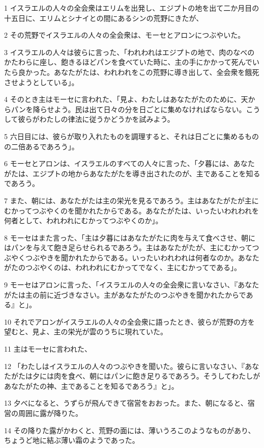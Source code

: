 \par 1 イスラエルの人々の全会衆はエリムを出発し、エジプトの地を出て二か月目の十五日に、エリムとシナイとの間にあるシンの荒野にきたが、
\par 2 その荒野でイスラエルの人々の全会衆は、モーセとアロンにつぶやいた。
\par 3 イスラエルの人々は彼らに言った、「われわれはエジプトの地で、肉のなべのかたわらに座し、飽きるほどパンを食べていた時に、主の手にかかって死んでいたら良かった。あなたがたは、われわれをこの荒野に導き出して、全会衆を餓死させようとしている」。
\par 4 そのとき主はモーセに言われた、「見よ、わたしはあなたがたのために、天からパンを降らせよう。民は出て日々の分を日ごとに集めなければならない。こうして彼らがわたしの律法に従うかどうかを試みよう。
\par 5 六日目には、彼らが取り入れたものを調理すると、それは日ごとに集めるものの二倍あるであろう」。
\par 6 モーセとアロンは、イスラエルのすべての人々に言った、「夕暮には、あなたがたは、エジプトの地からあなたがたを導き出されたのが、主であることを知るであろう。
\par 7 また、朝には、あなたがたは主の栄光を見るであろう。主はあなたがたが主にむかってつぶやくのを聞かれたからである。あなたがたは、いったいわれわれを何者として、われわれにむかってつぶやくのか」。
\par 8 モーセはまた言った、「主は夕暮にはあなたがたに肉を与えて食べさせ、朝にはパンを与えて飽き足らせられるであろう。主はあなたがたが、主にむかってつぶやくつぶやきを聞かれたからである。いったいわれわれは何者なのか。あなたがたのつぶやくのは、われわれにむかってでなく、主にむかってである」。
\par 9 モーセはアロンに言った、「イスラエルの人々の全会衆に言いなさい、『あなたがたは主の前に近づきなさい。主があなたがたのつぶやきを聞かれたからである』と」。
\par 10 それでアロンがイスラエルの人々の全会衆に語ったとき、彼らが荒野の方を望むと、見よ、主の栄光が雲のうちに現れていた。
\par 11 主はモーセに言われた、
\par 12 「わたしはイスラエルの人々のつぶやきを聞いた。彼らに言いなさい、『あなたがたは夕には肉を食べ、朝にはパンに飽き足りるであろう。そうしてわたしがあなたがたの神、主であることを知るであろう』と」。
\par 13 夕べになると、うずらが飛んできて宿営をおおった。また、朝になると、宿営の周囲に露が降りた。
\par 14 その降りた露がかわくと、荒野の面には、薄いうろこのようなものがあり、ちょうど地に結ぶ薄い霜のようであった。
